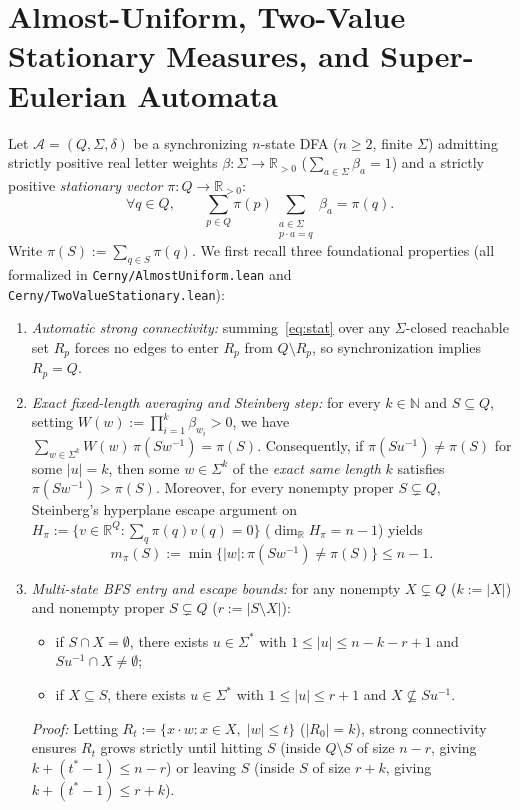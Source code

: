 \documentclass[11pt,a4paper]{article}
\theoremstyle{definition}
\theoremstyle{remark}
\newcommand{\R}{\mathbb{R}}
\newcommand{\N}{\mathbb{N}}
\newcommand{\cA}{\mathcal{A}}
\begin{document}
\section{Almost-Uniform, Two-Value Stationary Measures, and Super-Eulerian Automata}
\label{sec:stationary}

Let $\cA = (Q, \Sigma, \delta)$ be a synchronizing $n$-state DFA ($n \ge 2$, finite $\Sigma$) admitting strictly positive real letter weights $\beta : \Sigma \to \R_{>0}$ ($\sum_{a \in \Sigma} \beta_a = 1$) and a strictly positive \emph{stationary vector} $\pi : Q \to \R_{>0}$:
\begin{equation}
  \forall q \in Q, \qquad \sum_{p \in Q} \pi(p) \sum_{\substack{a \in \Sigma \\ p \cdot a = q}} \beta_a = \pi(q).
  \label{eq:stat}
\end{equation}
Write $\pi(S) := \sum_{q \in S} \pi(q)$. We first recall three foundational properties (all formalized in \texttt{Cerny/AlmostUniform.lean} and \texttt{Cerny/TwoValueStationary.lean}):
\begin{enumerate}[label=(\roman*),nosep]
  \item \emph{Automatic strong connectivity:} summing~\eqref{eq:stat} over any $\Sigma$-closed reachable set $R_p$ forces no edges to enter $R_p$ from $Q \setminus R_p$, so synchronization implies $R_p = Q$.
  \item \emph{Exact fixed-length averaging and Steinberg step:} for every $k \in \N$ and $S \subseteq Q$, setting $W(w) := \prod_{i=1}^k \beta_{w_i} > 0$, we have $\sum_{w \in \Sigma^k} W(w)\,\pi(S w^{-1}) = \pi(S)$. Consequently, if $\pi(S u^{-1}) \neq \pi(S)$ for some $|u| = k$, then some $w \in \Sigma^k$ of the \emph{exact same length} $k$ satisfies $\pi(S w^{-1}) > \pi(S)$. Moreover, for every nonempty proper $S \subsetneq Q$, Steinberg's hyperplane escape argument on $H_\pi := \{v \in \R^Q : \sum_q \pi(q) v(q) = 0\}$ ($\dim_\R H_\pi = n - 1$) yields
  \[
    m_\pi(S) := \min\{|w| : \pi(S w^{-1}) \neq \pi(S)\} \le n - 1.
  \]
  \item \emph{Multi-state BFS entry and escape bounds:} for any nonempty $X \subsetneq Q$ ($k := |X|$) and nonempty proper $S \subsetneq Q$ ($r := |S \setminus X|$):
  \begin{itemize}[nosep]
    \item if $S \cap X = \emptyset$, there exists $u \in \Sigma^*$ with $1 \le |u| \le n - k - r + 1$ and $S u^{-1} \cap X \neq \emptyset$;
    \item if $X \subseteq S$, there exists $u \in \Sigma^*$ with $1 \le |u| \le r + 1$ and $X \not\subseteq S u^{-1}$.
  \end{itemize}
  \emph{Proof:} Letting $R_t := \{x \cdot w : x \in X,\; |w| \le t\}$ ($|R_0| = k$), strong connectivity ensures $R_t$ grows strictly until hitting $S$ (inside $Q \setminus S$ of size $n - r$, giving $k + (t^* - 1) \le n - r$) or leaving $S$ (inside $S$ of size $r + k$, giving $k + (t^* - 1) \le r + k$).
\end{enumerate}
\end{document}
